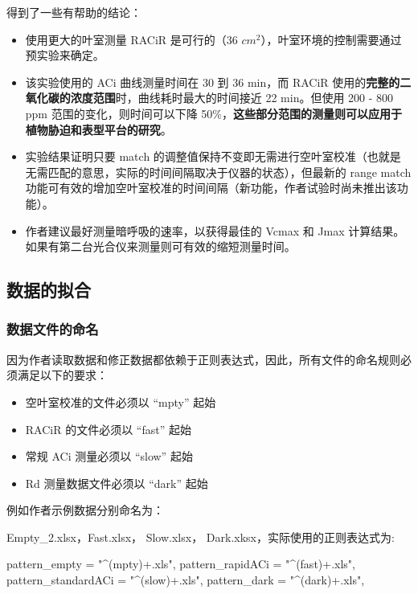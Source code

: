 \documentclass[
]{krantz}
\makeatletter
\newenvironment{Shaded}{\begin{snugshade}}{\end{snugshade}}
\newcommand{\NormalTok}[1]{#1}
\newcommand{\StringTok}[1]{\textcolor[rgb]{0.31,0.60,0.02}{#1}}
\newenvironment{kframe}{%
\medskip{}
\setlength{\fboxsep}{.8em}
 \def\at@end@of@kframe{}%
 \ifinner\ifhmode%
  \def\at@end@of@kframe{\end{minipage}}%
  \begin{minipage}{\columnwidth}%
 \fi\fi%
 \def\FrameCommand##1{\hskip\@totalleftmargin \hskip-\fboxsep
 \colorbox{shadecolor}{##1}\hskip-\fboxsep
     \hskip-\linewidth \hskip-\@totalleftmargin \hskip\columnwidth}%
 \MakeFramed {\advance\hsize-\width
   \@totalleftmargin\z@ \linewidth\hsize
   \@setminipage}}%
 {\par\unskip\endMakeFramed%
 \at@end@of@kframe}
\renewenvironment{Shaded}{\begin{kframe}}{\end{kframe}}
\makeatother
\begin{document}
得到了一些有帮助的结论：

\begin{itemize}
\item
  使用更大的叶室测量 RACiR 是可行的（36 \(cm^2\)），叶室环境的控制需要通过预实验来确定。
\item
  该实验使用的 ACi 曲线测量时间在 30 到 36 min，而 RACiR 使用的\textbf{完整的二氧化碳的浓度范围}时，曲线耗时最大的时间接近 22 min。但使用 200 - 800 ppm 范围的变化，则时间可以下降 50\%，\textbf{这些部分范围的测量则可以应用于植物胁迫和表型平台的研究}。
\item
  实验结果证明只要 match 的调整值保持不变即无需进行空叶室校准（也就是无需匹配的意思，实际的时间间隔取决于仪器的状态），但最新的 range match 功能可有效的增加空叶室校准的时间间隔（新功能，作者试验时尚未推出该功能）。
\item
  作者建议最好测量暗呼吸的速率，以获得最佳的 Vcmax 和 Jmax 计算结果。如果有第二台光合仪来测量则可有效的缩短测量时间。
\end{itemize}

\hypertarget{conifer-fit-racir}{%
\subsection{数据的拟合}\label{conifer-fit-racir}}

\hypertarget{name-files}{%
\subsubsection{数据文件的命名}\label{name-files}}

因为作者读取数据和修正数据都依赖于正则表达式，因此，所有文件的命名规则必须满足以下的要求：

\begin{itemize}
\item
  空叶室校准的文件必须以 ``mpty'' 起始
\item
  RACiR 的文件必须以 ``fast'' 起始
\item
  常规 ACi 测量必须以 ``slow'' 起始
\item
  Rd 测量数据文件必须以 ``dark'' 起始
\end{itemize}

例如作者示例数据分别命名为：

Empty\_2.xlsx，Fast.xlsx， Slow.xlsx， Dark.xksx，实际使用的正则表达式为:

\begin{Shaded}
\begin{Highlighting}[]
\NormalTok{pattern\_empty       =}\StringTok{ "\^{}(mpty)+.xls"}\NormalTok{,      }
\NormalTok{pattern\_rapidACi    =}\StringTok{ "\^{}(fast)+.xls"}\NormalTok{,      }
\NormalTok{pattern\_standardACi =}\StringTok{ "\^{}(slow)+.xls"}\NormalTok{,      }
\NormalTok{pattern\_dark        =}\StringTok{ "\^{}(dark)+.xls"}\NormalTok{,}
\end{Highlighting}
\end{Shaded}
\end{document}

